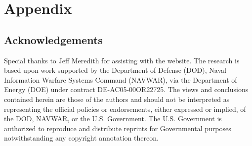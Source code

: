 \appendix
\section{Appendix}
\subsection*{Acknowledgements}
Special thanks to Jeff Meredith for assisting with the website. 
The research is based upon work supported by the Department of Defense (DOD), Naval Information Warfare Systems Command (NAVWAR), via the Department of Energy (DOE) under contract  DE-AC05-00OR22725. The views and conclusions contained herein are those of the authors and should not be interpreted as representing the official policies or endorsements, either expressed or implied, of the DOD, NAVWAR, or the U.S. Government. The U.S. Government is authorized to reproduce and distribute reprints for Governmental purposes notwithstanding any copyright annotation thereon. 
\\
